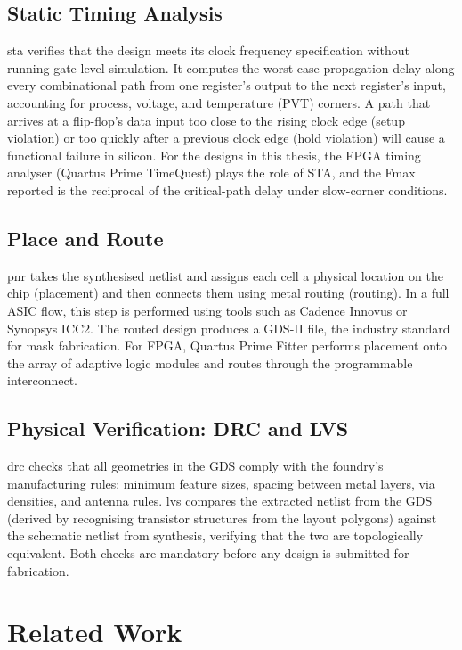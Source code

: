 \subsection{Static Timing Analysis}

\gls{sta} verifies that the design meets its clock frequency specification without
running gate-level simulation. It computes the worst-case propagation delay along
every combinational path from one register's output to the next register's input,
accounting for process, voltage, and temperature (PVT) corners. A path that arrives
at a flip-flop's data input too close to the rising clock edge (setup violation) or
too quickly after a previous clock edge (hold violation) will cause a functional failure
in silicon. For the designs in this thesis, the FPGA timing analyser (Quartus Prime
TimeQuest) plays the role of STA, and the Fmax reported is the reciprocal of the
critical-path delay under slow-corner conditions.

\subsection{Place and Route}

\gls{pnr} takes the synthesised netlist and assigns each cell a physical location on
the chip (placement) and then connects them using metal routing (routing). In a full
ASIC flow, this step is performed using tools such as Cadence Innovus or Synopsys
ICC2. The routed design produces a GDS-II file, the industry standard for mask
fabrication. For FPGA, Quartus Prime Fitter performs placement onto the array of
adaptive logic modules and routes through the programmable interconnect.

\subsection{Physical Verification: DRC and LVS}

\gls{drc} checks that all geometries in the GDS comply with the foundry's manufacturing
rules: minimum feature sizes, spacing between metal layers, via densities, and antenna
rules. \gls{lvs} compares the extracted netlist from the GDS (derived by recognising
transistor structures from the layout polygons) against the schematic netlist from
synthesis, verifying that the two are topologically equivalent. Both checks are
mandatory before any design is submitted for fabrication.

\section{Related Work}
\label{sec:related-work}

